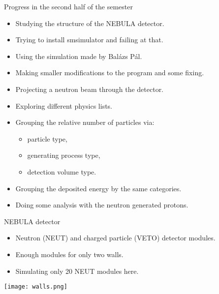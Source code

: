 \documentclass[11pt]{beamer}
\begin{document}
\begin{frame}{Progress in the second half of the semester}
    \begin{itemize}
        \item<tri@1-> Studying the structure of the NEBULA detector.
        \vspace{0.2 cm}
        \item<tri@1-> Trying to install smsimulator and failing at that.
        \vspace{0.2 cm}
        \item<tri@1-> Using the simulation made by Balázs Pál.
        \vspace{0.2 cm}
        \item<tri@1-> Making smaller modifications to the program and some fixing.
        \vspace{0.2 cm}
        \item<tri@1-> Projecting a neutron beam through the detector.
        \vspace{0.2 cm}
        \item<tri@1-> Exploring different physics lists.
        \vspace{0.2 cm}
        \item<tri@1-> Grouping the relative number of particles via:
        \begin{itemize}
        \vspace{0.1 cm}
            \item<square@1-> particle type,
            \vspace{0.1 cm}
            \item<square@1-> generating process type,
            \vspace{0.1 cm}
            \item<square@1-> detection volume type.
        \end{itemize}
        \vspace{0.2 cm}
        \item<tri@1-> Grouping the deposited energy by the same categories.
        \vspace{0.2 cm}
        \item<tri@1-> Doing some analysis with the neutron generated protons.
    \end{itemize}
\end{frame}

\begin{frame}{NEBULA detector}
    \begin{itemize}
        \item<tri@1-> Neutron (NEUT) and charged particle (VETO) detector modules.
        \vspace{0.2 cm}
        \item<tri@1-> Enough modules for only two walls.
        \vspace{0.2 cm}
        \item<tri@1-> Simulating only 20 NEUT modules here.
        \vspace{0.2 cm}
    \end{itemize}
    \centering
    \texttt{[image: walls.png]}
\end{frame}
\end{document}
